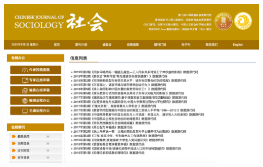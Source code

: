 \documentclass{beamer}
\begin{document}
\begin{frame}
	\includegraphics[scale=0.3]{社会}
\end{frame}
\end{document}
